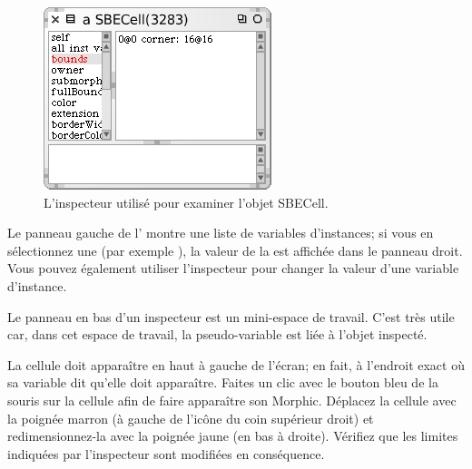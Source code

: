 \documentclass[a4paper,10pt,twoside]{book}
\begin{document}

\begin{figure}[htbp]
   \centering
   \includegraphics[scale=0.7]{SBECellInspector} 
   \caption{L'inspecteur utilisé pour examiner l'objet SBECell.\label{fig:SBECellInspector}}
\end{figure}

Le panneau gauche de l' montre une liste de variables d'instances; si vous en sélectionnez une (par exemple \mbox{),} la valeur de la  est affichée dans le panneau droit. Vous pouvez également utiliser l'inspecteur pour changer la valeur d'une variable d'instance.


Le panneau en bas d'un inspecteur est un mini-espace de travail. C'est très utile car, dans cet espace de travail, la pseudo-variable \self est liée à l'objet inspecté.

La cellule doit apparaître en haut à gauche de l'écran; en fait, à l'endroit exact o\`u sa variable  dit qu'elle doit apparaître.
Faites un clic avec le bouton bleu de la souris sur la cellule afin de faire apparaître son  Morphic.
Déplacez la cellule avec la poignée marron (à 
gauche de l'ic\^one du coin supérieur droit) et redimensionnez-la avec la poignée jaune (en bas à droite).
Vérifiez que les limites indiquées par l'inspecteur sont modifiées en conséquence.
\end{document}
